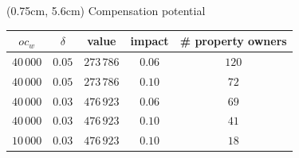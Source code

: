 \documentclass[aspectratio=169, xcolor=dvipsnames]{beamer}
\newcommand{\backupend}{
   \addtocounter{framenumberappendix}{-\value{framenumber}}
   \addtocounter{framenumber}{\value{framenumberappendix}} 
}
\begin{document}
\begin{frame}
\begin{textblock*}{14.5cm}(0.75cm, 5.6cm) %
\centering
Compensation potential
\vspace{-0.1cm}
\begin{table}
\begin{footnotesize}
	\begin{tabular}{c | c | c | c | c}
	$oc_w$  & $\delta$ & value & impact & \# property owners \\ \hline \hline
	$40\,000$ & $0.05$ & $273\,786$ & $0.06$ & $120$ \\ \hline
	$40\,000$ & $0.05$ & $273\,786$ & $0.10$ & $72$ \\ \hline
	$40\,000$ & $0.03$ & $476\,923$ & $0.06$ & $69$ \\ \hline
	$40\,000$ & $0.03$ & $476\,923$ & $0.10$ & $41$ \\ \hline
	$10\,000$ & $0.03$ & $476\,923$ & $0.10$ & $18$ \\ \hline
	\end{tabular}
\end{footnotesize}
\end{table}
\end{textblock*}

\end{frame}
\backupend
\end{document}
